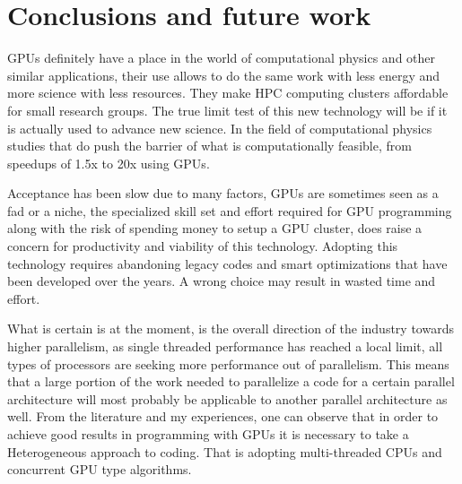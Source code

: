 
\chapter{Conclusions and future work} %

\label{Conclusions and future work} %


GPUs definitely have a place in the world of computational physics and other similar applications, their use allows to do the same work with less energy and more science with less resources. They make HPC computing clusters affordable for small research groups. The true limit test of this new technology will be if it is actually used to advance new science. In the field of computational physics studies that do push the barrier of what is computationally feasible, from speedups of 1.5x to 20x using GPUs\cite{applications}.

Acceptance has been slow due to many factors, GPUs are sometimes seen as a fad or a niche, the specialized skill set and effort required for GPU programming along with the risk of spending money to setup a GPU cluster, does raise a concern for productivity and viability of this technology. Adopting this technology requires abandoning legacy codes and smart optimizations that have been developed over the years. A wrong choice may result in wasted time and effort.

What is certain is at the moment, is the overall direction of the industry towards higher parallelism, as single threaded performance has reached a local limit, all types of processors are seeking more performance out of parallelism. This means that a large portion of the work needed to parallelize a code for a certain parallel architecture will most probably be applicable to another parallel architecture as well. From the literature and my experiences, one can observe that in order to achieve good results in programming with GPUs it is necessary to take a Heterogeneous approach to coding. That is adopting multi-threaded CPUs and concurrent GPU type algorithms.

